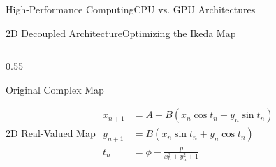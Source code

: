 \documentclass[aspectratio=169]{beamer}
\begin{document}
\begin{frame}{High-Performance Computing}{CPU vs. GPU Architectures}
    \begin{center}
    \end{center}
\end{frame}

\begin{frame}{2D Decoupled Architecture}{Optimizing the Ikeda Map}
    \begin{columns}[T, onlytextwidth]
        
        \begin{column}{0.55\textwidth}
            \vspace*{-0.9cm} %
            
            \begin{customblock}{Original Complex Map}
                \vspace{-0.2cm} %
                \centering
            \end{customblock}
            
            \vspace*{-0.15cm} %
            
            \begin{customblock}{2D Real-Valued Map}
                \vspace{-0.2cm} %
                \centering
                $\begin{aligned}
                    x_{n+1} &= A + B(x_n \cos t_n - y_n \sin t_n) \\
                    y_{n+1} &= B(x_n \sin t_n + y_n \cos t_n) \\
                    t_n &= \phi - \frac{p}{x_n^2 + y_n^2 + 1}
                \end{aligned}$
            \end{customblock}
            

\end{column}
\end{columns}
\end{frame}
\end{document}
